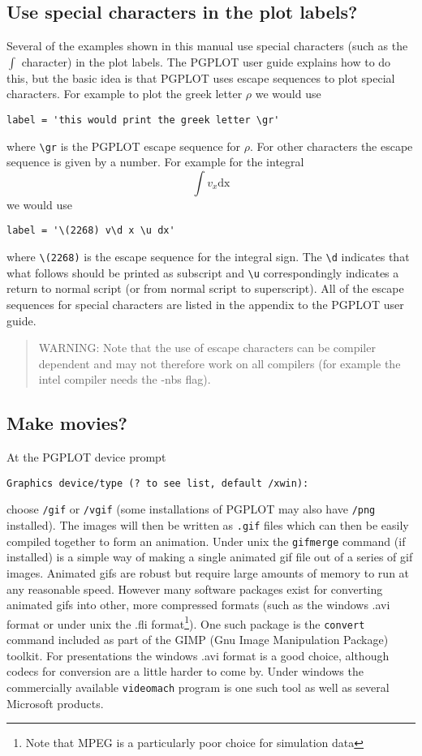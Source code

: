 \documentclass[a4paper,11pt]{article}
\begin{document}
\subsection{Use special characters in the plot labels?}
 Several of the examples shown in this manual use special characters (such as
the $\int$ character) in the plot labels. The PGPLOT user guide explains how to do
this, but the basic idea is that PGPLOT uses escape sequences to plot special
characters. For example to plot the greek letter $\rho$ we would use
\begin{verbatim}
label = 'this would print the greek letter \gr'
\end{verbatim}
where \verb+\gr+ is the PGPLOT escape sequence for $\rho$. For other
characters the escape sequence is given by a number. For example for the integral 
\begin{equation}
\int v_x \mathrm{dx}
\end{equation}
we would use
\begin{verbatim}
label = '\(2268) v\d x \u dx'
\end{verbatim}
where \verb+\(2268)+ is the escape sequence for the integral sign. The
\verb+\d+ indicates that what follows should be printed as subscript and
\verb+\u+ correspondingly indicates a return to normal script (or from normal script to
superscript). All of the escape sequences for special characters are listed in
the appendix to the PGPLOT user guide.
\begin{quote}
 WARNING: Note that the use of escape characters can be compiler dependent and
 may not therefore work on all compilers (for example the intel compiler needs
 the -nbs flag).
\end{quote}

\subsection{Make movies?}
 At the PGPLOT device prompt
\begin{verbatim}
Graphics device/type (? to see list, default /xwin):
\end{verbatim}
choose \verb+/gif+ or \verb+/vgif+ (some installations of PGPLOT may also have \verb+/png+
installed). The images will then be written as \verb+.gif+ files which can then be easily compiled
together to form an animation. Under unix the \verb+gifmerge+ command (if installed) is a simple way
of making a single animated gif file out of a series of gif images. Animated gifs are robust but
require large amounts of memory to run at any reasonable speed. However many software packages exist
for converting animated gifs into other, more compressed formats (such as the windows .avi format or
under unix the .fli format\footnote{Note that MPEG is a particularly poor choice for simulation data}). One such package is the
\verb+convert+ command included as part of the GIMP (Gnu Image Manipulation Package) toolkit.
For presentations the windows .avi format is a good choice, although codecs for conversion are a
little harder to come by. Under windows the commercially available \verb+videomach+ program is one
such tool as well as several Microsoft products.
\end{document}
